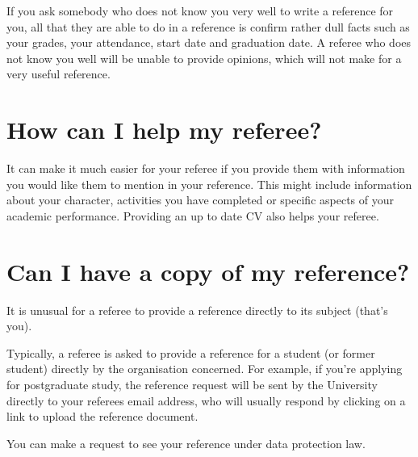 \documentclass[
  12pt,
]{book}
\begin{document}
If you ask somebody who does not know you very well to write a reference for you, all that they are able to do in a reference is confirm rather dull facts such as your grades, your attendance, start date and graduation date. A referee who does not know you well will be unable to provide opinions, which will not make for a very useful reference.

\hypertarget{how-can-i-help-my-referee}{%
\section{How can I help my referee?}\label{how-can-i-help-my-referee}}

It can make it much easier for your referee if you provide them with information you would like them to mention in your reference. This might include information about your character, activities you have completed or specific aspects of your academic performance. Providing an up to date CV also helps your referee.

\hypertarget{can-i-have-a-copy-of-my-reference}{%
\section{Can I have a copy of my reference?}\label{can-i-have-a-copy-of-my-reference}}

It is unusual for a referee to provide a reference directly to its subject (that's you).

Typically, a referee is asked to provide a reference for a student (or former student) directly by the organisation concerned. For example, if you're applying for postgraduate study, the reference request will be sent by the University directly to your referees email address, who will usually respond by clicking on a link to upload the reference document.

You can make a request to see your reference under data protection law.

  
\end{document}
